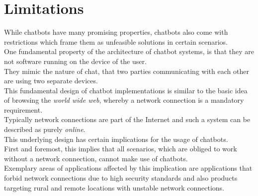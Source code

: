 \section{Limitations}
\label{limitations}


While chatbots have many promising properties, chatbots also come with restrictions
which frame them as unfeasible solutions in certain scenarios.
\\

One fundamental property of the architecture of chatbot systems,
is that they are not software running on the device of the user.
\\
They mimic the nature of chat, that two parties communicating with each other are using two separate devices.
\\
This fundamental design of chatbot implementations is similar to the basic
idea of browsing the \emph{world wide web}, whereby a network connection is a mandatory requirement.
\\
Typically network connections are part of the Internet
and such a system can be described as purely \emph{online}.
\\

This underlying design has certain implications for the usage of chatbots.
\\

First and foremost, this implies that all scenarios, which are obliged to work without a network connection,
cannot make use of chatbots.
\\
Exemplary areas of applications affected by this implication are
applications that forbid network connections due to high security standards
and also products targeting rural and remote locations with unstable network connections.
\\

